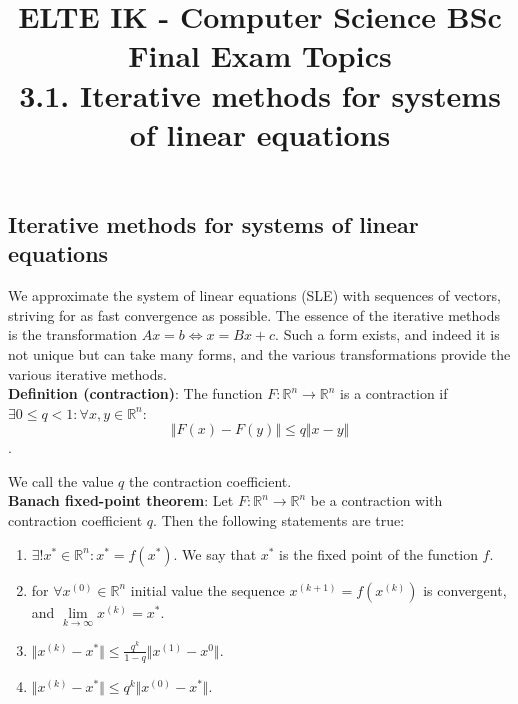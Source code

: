 \documentclass[margin=0px]{article}
\title{\textbf{{\Large ELTE IK - Computer Science BSc} \vspace{0.2cm} \\ {\huge Final Exam Topics}} \vspace{0.3cm} \\ 3.1. Iterative methods for systems of linear equations}
\author{}
\date{}
\begin{document}
\maketitle

\begin{center}
\end{center}

\subsection{Iterative methods for systems of linear equations}

We approximate the system of linear equations (SLE) with sequences of vectors, striving for as fast convergence as possible.
The essence of the iterative methods is the transformation $Ax = b \Longleftrightarrow x = Bx + c$. Such a form exists,
and indeed it is not unique but can take many forms, and the various transformations provide the various iterative methods.\\

\noindent \textbf{Definition (contraction)}: The function $F: \mathbb{R}^{n} \to \mathbb{R}^{n}$ is a contraction if
$\exists 0 \leq q < 1 : \forall x,y \in \mathbb{R}^{n}:$
\begin{displaymath}
    \Vert F(x) - F(y) \Vert \leq q \Vert x - y \Vert
\end{displaymath}.

\noindent We call the value $q$ the contraction coefficient.\\

\noindent \textbf{Banach fixed-point theorem}: Let $F: \mathbb{R}^{n} \to \mathbb{R}^{n}$ be a contraction with contraction
coefficient $q$. Then the following statements are true:

\begin{enumerate}
    \item	$\exists! x^{*} \in \mathbb{R}^{n}: x^{*} = f(x^{*})$. We say that $x^{*}$ is the
          fixed point of the function $f$.

    \item	for $\forall x^{(0)} \in \mathbb{R}^{n}$ initial value the sequence $x^{(k+1)} = f(x^{(k)})$ is convergent,
          and $\lim \limits_{k\to\infty} x^{(k)} = x^{*}$.

    \item	$\Vert x^{(k)} - x^{*}\Vert \leq \frac{q^{k}}{1-q} \Vert x^{(1)} - x^{0}\Vert$.

    \item	$\Vert x^{(k)} - x^{*}\Vert \leq q^{k} \Vert x^{(0)} - x^{*}\Vert$.
\end{enumerate}
\end{document}
